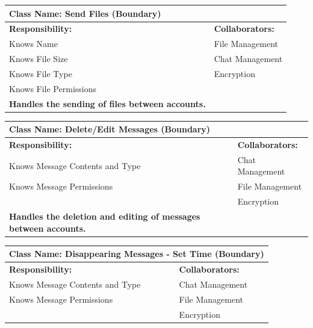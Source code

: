 \documentclass[]{article}
\begin{document}
\begin{itemize}
 
	\begin{table}[ht]
		\centering
		\begin{tabular}{|p{7cm}|p{7cm}|}
		\hline 
		 \multicolumn{2}{|l|}{\textbf{Class Name:} Send Files (Boundary)} \\
		\hline
		\textbf{Responsibility:} & \textbf{Collaborators:} \\
		\hline
            Knows Name & File Management\\
            Knows File Size & Chat Management\\
            Knows File Type & Encryption\\
            Knows File Permissions\\
            
            \vspace{0.1in}
            \textbf{Handles the sending of files between accounts.}

		\vspace{1in} & \\
		\hline
  
		\end{tabular}
	\end{table}

	\begin{table}[ht]
		\centering
		\begin{tabular}{|p{7cm}|p{7cm}|}
		\hline 
		 \multicolumn{2}{|l|}{\textbf{Class Name:} Delete/Edit Messages (Boundary)} \\
		\hline
		\textbf{Responsibility:} & \textbf{Collaborators:} \\
		\hline
            Knows Message Contents and Type & Chat Management\\
            Knows Message Permissions & File Management\\
            & Encryption\\
            
            \vspace{0.1in}
            \textbf{Handles the deletion and editing of messages between accounts.}

		\vspace{1in} & \\
		\hline
  
		\end{tabular}
	\end{table}

	\begin{table}[ht]
		\centering
		\begin{tabular}{|p{7cm}|p{7cm}|}
		\hline 
		 \multicolumn{2}{|l|}{\textbf{Class Name:} Disappearing Messages - Set Time (Boundary)} \\
		\hline
		\textbf{Responsibility:} & \textbf{Collaborators:} \\
		\hline
            Knows Message Contents and Type & Chat Management\\
            Knows Message Permissions & File Management\\
            & Encryption\\
            

\end{tabular}
\end{table}
\end{itemize}
\end{document}
